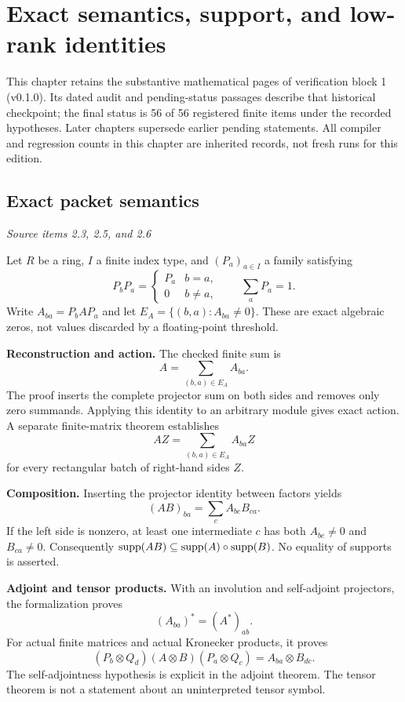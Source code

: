 \clearpage\FloatBarrier\section{Exact semantics, support, and low-rank identities}\label{supp1:section:001}
This chapter retains the substantive mathematical pages of verification block 1 (v0.1.0). Its dated audit and pending-status passages describe that historical checkpoint; the final status is 56 of 56 registered finite items under the recorded hypotheses. Later chapters supersede earlier pending statements. All compiler and regression counts in this chapter are inherited records, not fresh runs for this edition.\par

\subsection{Exact packet semantics}\label{supp1:subsection:001}\textit{Source items 2.3, 2.5, and 2.6}\par
Let $R$ be a ring, $I$ a finite index type, and $(P_a)_{a\in I}$ a family satisfying
\[
P_bP_a=\begin{cases}P_a&b=a,\\0&b\ne a,\end{cases}
\qquad \sum_aP_a=1.
\]
Write $A_{ba}=P_bAP_a$ and let $E_A=\{(b,a):A_{ba}\ne0\}$. These are exact algebraic zeros, not values discarded by a floating-point threshold.

\textbf{Reconstruction and action.} The checked finite sum is
\[
\boxed{A=\sum_{(b,a)\in E_A} A_{ba}.}
\]
The proof inserts the complete projector sum on both sides and removes only zero summands. Applying this identity to an arbitrary module gives exact action. A separate finite-matrix theorem establishes
\[
AZ=\sum_{(b,a)\in E_A}A_{ba}Z
\]
for every rectangular batch of right-hand sides $Z$.

\textbf{Composition.} Inserting the projector identity between factors yields
\[
\boxed{(AB)_{ba}=\sum_c A_{bc}B_{ca}.}
\]
If the left side is nonzero, at least one intermediate $c$ has both $A_{bc}\ne0$ and $B_{ca}\ne0$. Consequently $\operatorname{supp}(AB)\subseteq\operatorname{supp}(A)\circ\operatorname{supp}(B)$. No equality of supports is asserted.

\textbf{Adjoint and tensor products.} With an involution and self-adjoint projectors, the formalization proves
\[
(A_{ba})^*=(A^*)_{ab}.
\]
For actual finite matrices and actual Kronecker products, it proves
\[
(P_b\otimes Q_d)(A\otimes B)(P_a\otimes Q_c)
=A_{ba}\otimes B_{dc}.
\]
The self-adjointness hypothesis is explicit in the adjoint theorem. The tensor theorem is not a statement about an uninterpreted tensor symbol.


